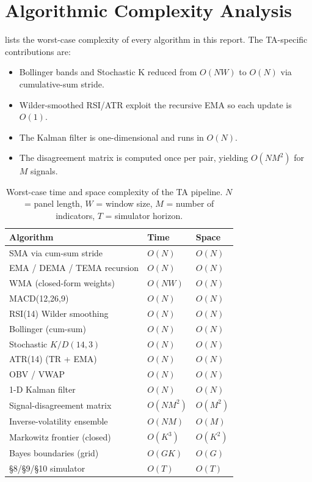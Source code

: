 \documentclass[runningheads]{llncs}
\begin{document}
\section{Algorithmic Complexity Analysis}\label{sec:complexity}
 lists the worst-case complexity of every
algorithm in this report. The TA-specific contributions are:
\begin{itemize}
\item Bollinger bands and Stochastic K reduced from
$O(NW)$ to $O(N)$ via cumulative-sum stride.
\item Wilder-smoothed RSI/ATR exploit the recursive EMA so each
update is $O(1)$.
\item The Kalman filter is one-dimensional and runs in $O(N)$.
\item The disagreement matrix is computed once per pair, yielding
$O(N M^{2})$ for $M$ signals.
\end{itemize}
\begin{table}[!htbp]
\centering\small
\caption{Worst-case time and space complexity of the TA pipeline.
$N$ = panel length, $W$ = window size, $M$ = number of indicators,
$T$ = simulator horizon.}\label{tab:complexity}
\begin{tabular}{lll}
\toprule
Algorithm & Time & Space\\
\midrule
SMA via cum-sum stride       & $O(N)$ & $O(N)$\\
EMA / DEMA / TEMA recursion  & $O(N)$ & $O(N)$\\
WMA (closed-form weights)    & $O(NW)$ & $O(N)$\\
MACD(12,26,9)                & $O(N)$ & $O(N)$\\
RSI(14) Wilder smoothing     & $O(N)$ & $O(N)$\\
Bollinger (cum-sum)          & $O(N)$ & $O(N)$\\
Stochastic $K\!/\!D(14,3)$   & $O(N)$ & $O(N)$\\
ATR(14) (TR + EMA)           & $O(N)$ & $O(N)$\\
OBV / VWAP                   & $O(N)$ & $O(N)$\\
1-D Kalman filter            & $O(N)$ & $O(N)$\\
Signal-disagreement matrix   & $O(NM^{2})$ & $O(M^{2})$\\
Inverse-volatility ensemble  & $O(NM)$ & $O(M)$\\
Markowitz frontier (closed)  & $O(K^{3})$ & $O(K^{2})$\\
Bayes boundaries (grid)      & $O(GK)$ & $O(G)$\\
§8/§9/§10 simulator          & $O(T)$ & $O(T)$\\
\bottomrule
\end{tabular}
\end{table}
\end{document}
